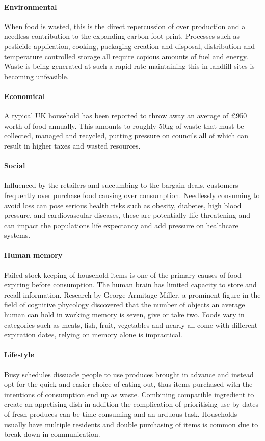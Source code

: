 \documentclass[a4paper, 11pt]{article}
\begin{document}
\paragraph{Environmental}When food is wasted, this is the direct repercussion of over production and a needless contribution to the expanding carbon foot print. Processes such as pesticide application, cooking, packaging creation and disposal, distribution and temperature controlled storage all require copious amounts of fuel and energy. Waste is being generated at such a rapid rate maintaining this in landfill sites is becoming unfeasible.

\paragraph{Economical}A typical UK household has been reported to throw away an average of \pounds950 worth of food annually. This amounts to roughly 50kg of waste that must be collected, managed and recycled, putting pressure on councils all of which can result in higher taxes and wasted resources.\cite{FoodWaste}

\paragraph{Social} Influenced by the retailers and succumbing to the bargain deals, customers frequently over purchase food causing over consumption. Needlessly consuming to avoid loss can pose serious health risks such as obesity, diabetes, high blood pressure, and cardiovascular diseases, these are potentially life threatening and can impact the populations life expectancy and add pressure on healthcare systems. 

\paragraph{Human memory}Failed stock keeping of household items is one of the primary causes of food expiring before consumption. The human brain has limited capacity to store and recall information. Research by George Armitage Miller, a prominent figure in the field of cognitive phycology discovered that the number of objects an average human can hold in working memory is seven, give or take two.\cite{memory} Foods vary in categories such as meats, fish, fruit, vegetables and nearly all come with different expiration dates, relying on memory alone is impractical. 

\paragraph{Lifestyle} Busy schedules dissuade people to use produces brought in advance and instead opt for the quick and easier choice of eating out, thus items purchased with the intentions of consumption end up as waste. Combining compatible ingredient to create an appetising dish in addition the complication of prioritising use-by-dates of fresh produces can be time consuming and an arduous task. Households usually have multiple residents and double purchasing of items is common due to break down in communication. 
\end{document}

